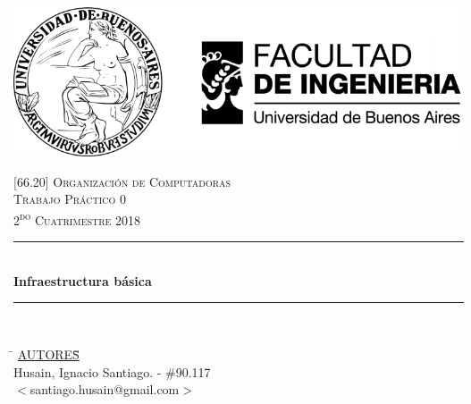 

\pagestyle{fancy}
\begin{titlepage}
	\newcommand{\HRule}{\rule{\linewidth}{0.5mm}} %
	\center %

	\thispagestyle{empty}
	\begin{center}
		\includegraphics[scale=1]{includes/banner_fiuba.pdf}\\
	\end{center}


	\textsc{\LARGE \textsc{[66.20] Organización de Computadoras}}\\[1cm]
	\textsc{\Large \textsc{Trabajo Práctico 0}}\\[0.5cm]
	\textsc{\large 2\textsuperscript{do} Cuatrimestre 2018}\\[0.5cm]

	\HRule\\[0.5cm]
	{\huge\bfseries Infraestructura básica}\\[0.2cm]
	\HRule\\[0.5cm]

	\begin{tabbing}
		\hspace{2cm}\=\+
		\underline{AUTORES}\hspace{-1cm}\=\+\hspace{1cm}\=\hspace{6cm}\=\\[0.2cm]

		Husain, Ignacio Santiago.	\>\>- \#90.117\\
		\>\footnotesize{$<$santiago.husain@gmail.com$>$}\\


\end{tabbing}
\end{titlepage}
